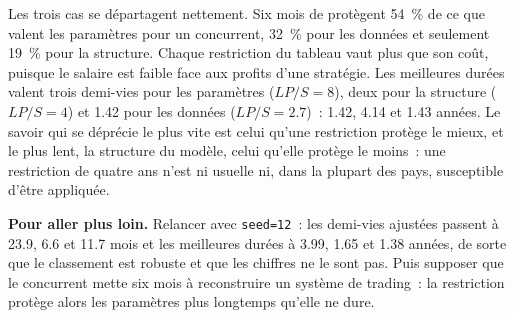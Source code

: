 Les trois cas se départagent nettement. Six mois de  protègent 54~\% de ce que valent les paramètres pour un concurrent, 32~\% pour les données et seulement 19~\% pour
la structure. Chaque restriction du tableau vaut plus que son coût, puisque le salaire est faible face aux profits d'une stratégie. Les meilleures durées
valent trois demi-vies pour les paramètres ($LP/S=8$), deux pour la structure ($LP/S=4$) et 1.42 pour les données ($LP/S=2.7$)~: 1.42, 4.14 et 1.43 années.
Le savoir qui se déprécie le plus vite est celui qu'une restriction protège le mieux, et le plus lent, la structure du modèle, celui qu'elle protège le moins~: une
restriction de quatre ans n'est ni usuelle ni, dans la plupart des pays, susceptible d'être appliquée.

\textbf{Pour aller plus loin.} Relancer avec \texttt{seed=12}~: les demi-vies ajustées passent à 23.9, 6.6 et 11.7 mois et les meilleures durées à 3.99, 1.65
et 1.38 années, de sorte que le classement est robuste et que les chiffres ne le sont pas. Puis supposer que le concurrent mette six mois à reconstruire un système de
trading~: la restriction protège alors les paramètres plus longtemps qu'elle ne dure.

\begin{omfigure}

\label{fig:fm:intellectual-property-and-non-competes:toolbox}
\end{omfigure}

